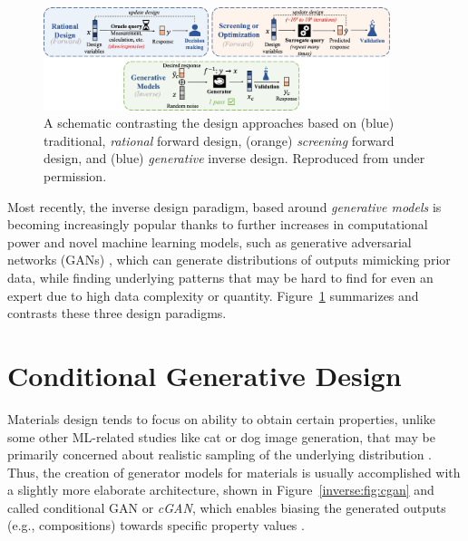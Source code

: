 \begin{figure}[H]
    \centering
    \includegraphics[width=0.9\textwidth]{inversedesign/inverse_fig1.png}
    \caption{A schematic contrasting the design approaches based on (blue) traditional, \emph{rational} forward design, (orange) \emph{screening} forward design, and (blue) \emph{generative} inverse design. Reproduced from \cite{Debnath2023ComparingAlloys} under permission.}
    \label{inverse:fig:designs}
\end{figure}

Most recently, the inverse design paradigm, based around \emph{generative models} is becoming increasingly popular thanks to further increases in computational power and novel machine learning models, such as generative adversarial networks (GANs) \cite{Goodfellow2020GenerativeNetworks}, which can generate distributions of outputs mimicking prior data, while finding underlying patterns that may be hard to find for even an expert due to high data complexity or quantity. Figure~\ref{inverse:fig:designs} summarizes and contrasts these three design paradigms.


\section{Conditional Generative Design} \label{inverse:sec:cgan}

Materials design tends to focus on ability to obtain certain properties, unlike some other ML-related studies like cat or dog image generation, that may be primarily concerned about realistic sampling of the underlying distribution \cite{Ching-YuanBaiJuliaElliott2019GenerativeImages}. Thus, the creation of generator models for materials is usually accomplished with a slightly more elaborate architecture, shown in Figure~\ref{inverse:fig:cgan} and called conditional GAN or \emph{cGAN}, which enables biasing the generated outputs (e.g., compositions) towards specific property values \cite{Mirza2014ConditionalNets, Arjovsky2017WassersteinNetworks}.

